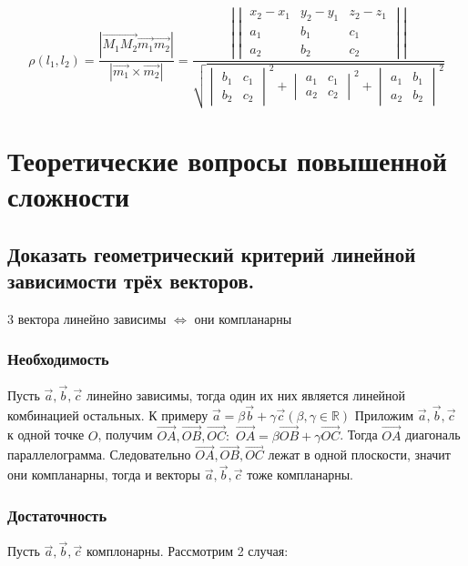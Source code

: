 \documentclass[a4paper, 10pt]{article}
\newcommand{\bvec}[1]{\overrightarrow{#1}}
\renewcommand{\a}{\vec{a}}
\renewcommand{\b}{\vec{b}}
\renewcommand{\c}{\vec{c}}
\newcommand{\image}[2]{
	\begin{figure}[H]
		\center{\texttt{[image: img/\#1]} }
    \end{figure}
}
\begin{document}
$$\rho(l_1, l_2) = \frac{ |\bvec{M_1M_2}\vec{m_1}\vec{m_2}| }{ |\vec{m_1}\times\vec{m_2}| }=
\frac{ |\begin{vmatrix}x_2-x_1&y_2-y_1&z_2-z_1\\a_1&b_1&c_1\\a_2&b_2&c_2\end{vmatrix}| }
    {\sqrt{\begin{vmatrix}b_1&c_1\\b_2&c_2\end{vmatrix}^2+
    \begin{vmatrix}a_1&c_1\\a_2&c_2\end{vmatrix}^2+
    \begin{vmatrix}a_1&b_1\\a_2&b_2\end{vmatrix}^2}}$$

\section{Теоретические вопросы повышенной сложности}

\subsection{Доказать геометрический критерий линейной зависимости трёх векторов.}

3 вектора линейно зависимы $\iff$ они компланарны

\subsubsection{Необходимость}

Пусть $\a, \b, \c$ линейно зависимы, тогда один их них является линейной комбинацией
остальных. К примеру $\a = \beta\b + \gamma\c (\beta,\gamma \in \mathbb{R})$
Приложим $\a, \b, \c$ к одной точке $O$, получим $\bvec{OA}, \bvec{OB}, \bvec{OC}:$
$\bvec{OA} = \beta\bvec{OB} + \gamma\bvec{OC}$. Тогда $\bvec{OA}$ диагональ параллелограмма.
Следовательно $\bvec{OA}, \bvec{OB}, \bvec{OC}$ лежат в одной плоскости, значит они компланарны,
тогда и векторы $\a, \b, \c$ тоже компланарны.
\image{3.png}{200}

\subsubsection{Достаточность}

Пусть $\a, \b, \c$ комплонарны. Рассмотрим 2 случая:
\end{document}
